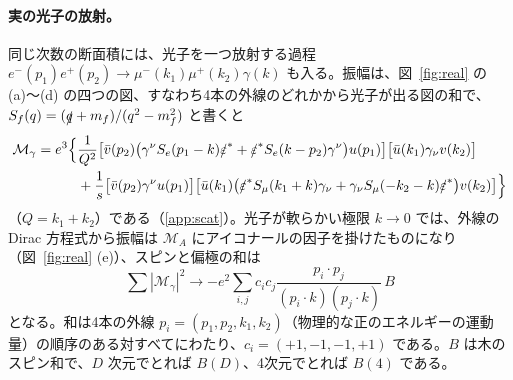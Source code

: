 \documentclass[a4paper,10pt]{ltjsarticle}
\begin{document}
\paragraph{実の光子の放射。}同じ次数の断面積には、光子を一つ放射する過程 $e^-(p_1)e^+(p_2)\to\mu^-(k_1)\mu^+(k_2)\gamma(k)$ も入る。振幅は、図~\ref{fig:real} の (a)〜(d) の四つの図、すなわち4本の外線のどれかから光子が出る図の和で、$S_f(q)=(\slashed q+m_f)/(q^2-m_f^2)$ と書くと
\begin{equation*}
\begin{aligned}
\mathcal M_\gamma=e^3\Bigl\{&\frac{1}{Q^2}\bigl[\bar v(p_2)\bigl(\gamma^\nu S_e(p_1-k)\slashed\varepsilon^*+\slashed\varepsilon^*S_e(k-p_2)\gamma^\nu\bigr)u(p_1)\bigr]\bigl[\bar u(k_1)\gamma_\nu v(k_2)\bigr]\\
&+\frac1s\bigl[\bar v(p_2)\gamma^\nu u(p_1)\bigr]\bigl[\bar u(k_1)\bigl(\slashed\varepsilon^*S_\mu(k_1+k)\gamma_\nu+\gamma_\nu S_\mu(-k_2-k)\slashed\varepsilon^*\bigr)v(k_2)\bigr]\Bigr\}
\end{aligned}
\end{equation*}
（$Q=k_1+k_2$）である（\ref{app:scat}）。光子が軟らかい極限 $k\to0$ では、外線の Dirac 方程式から振幅は $\mathcal M_A$ にアイコナールの因子を掛けたものになり（図~\ref{fig:real} (e)）、スピンと偏極の和は
\begin{equation*}
\sum|\mathcal M_\gamma|^2\to-e^2\sum_{i,j}c_ic_j\frac{p_i\cdot p_j}{(p_i\cdot k)(p_j\cdot k)}\,B
\end{equation*}
となる。和は4本の外線 $p_i=(p_1,p_2,k_1,k_2)$（物理的な正のエネルギーの運動量）の順序のある対すべてにわたり、$c_i=(+1,-1,-1,+1)$ である。$B$ は木のスピン和で、$D$ 次元でとれば $B(D)$、4次元でとれば $B(4)$ である。
\end{document}
